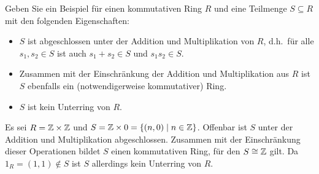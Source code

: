 \begin{question}[subtitle = Zur Definition von Unterringen]
  Geben Sie ein Beispiel für einen kommutativen Ring $R$ und eine Teilmenge $S \subseteq R$ mit den folgenden Eigenschaften:
  \begin{itemize}
    \item
      $S$ ist abgeschlossen unter der Addition und Multiplikation von $R$, d.h.\ für alle $s_1, s_2 \in S$ ist auch $s_1 + s_2 \in S$ und $s_1 s_2 \in S$.
    \item
      Zusammen mit der Einschränkung der Addition und Multiplikation aus $R$ ist $S$ ebenfalls ein (notwendigerweise kommutativer) Ring.
    \item
      $S$ ist kein Unterring von $R$.
  \end{itemize}
\end{question}


\begin{solution}
  Es sei $R = \mathbb{Z} \times \mathbb{Z}$ und $S = \mathbb{Z} \times 0 = \{(n,0) \mid n \in \mathbb{Z}\}$.
  Offenbar ist $S$ unter der Addition und Multiplikation abgeschlossen.
  Zusammen mit der Einschränkung dieser Operationen bildet $S$ einen kommutativen Ring, für den $S \cong \mathbb{Z}$ gilt.
  Da $1_R = (1,1) \notin S$ ist $S$ allerdings kein Unterring von $R$.
\end{solution}


